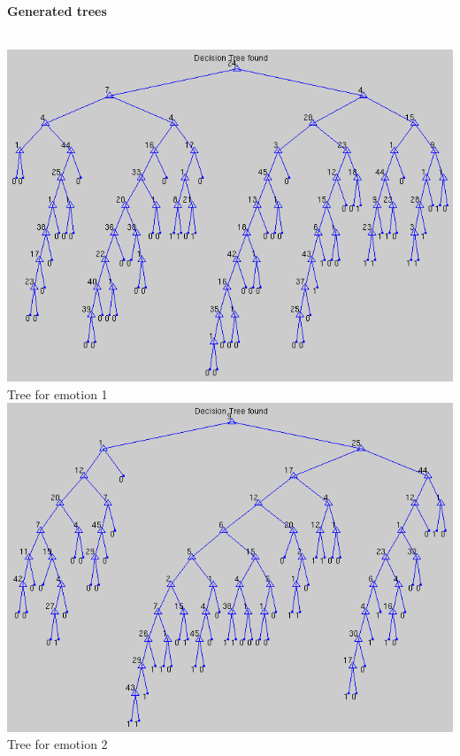 \documentclass[12pt]{article}
\begin{document}
{\bf Generated trees} \\ \\
\begin{center}
  \includegraphics[scale=0.28]{report-images/tree1.png} \\
  Tree for emotion 1 \\
  \vspace{\baselineskip}
  \includegraphics[scale=0.28]{report-images/tree2.png} \\
  Tree for emotion 2 \\
  \vspace{\baselineskip}

\end{center}
\end{document}
